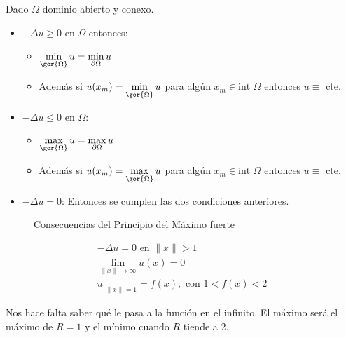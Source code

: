 		\begin{theorem}  \label{prop:MaximoFuerte}

			Dado $\Omega$ dominio abierto y conexo.

			\begin{itemize}
				\item $-\Delta u \geq 0$ en $\Omega$ entonces:
				\begin{itemize}
					\item $\min\limits_{\gor{\Omega}} u = \min\limits_{\partial \Omega} u$
					\item Además si $u(x_m) = \min\limits_{\gor{\Omega}} u$ para algún $x_m \in \text{int } \Omega$ entonces $u \equiv$ cte.
				\end{itemize}

				\item $-\Delta u \leq 0$ en $\Omega$:
				\begin{itemize}
					\item $\max\limits_{\gor{\Omega}} u = \max\limits_{\partial \Omega} u$
					\item Además si $u(x_m) = \max\limits_{\gor{\Omega}} u$ para algún $x_m \in \text{int } \Omega$ entonces $u \equiv$ cte.
				\end{itemize}

				\item $-\Delta u = 0$: Entonces se cumplen las dos condiciones anteriores.

			\end{itemize}

		\end{theorem}

		\begin{figure}[hbtp]
			\begin{minipage}[t]{0.33\linewidth}
			\end{minipage}
			\begin{minipage}[t]{0.33\linewidth}
			\end{minipage}
			\begin{minipage}[t]{0.33\linewidth}
			\end{minipage}
			\caption{Consecuencias del Principio del Máximo fuerte}
		\end{figure}

		\begin{example}

			\[\begin{array}{l}
				-\Delta u = 0 \text{ en } \|x\| > 1 \\
				\lim\limits_{\|x\| \to \infty} u(x) = 0 \\
				u|_{\|x\| = 1} = f(x), \text{ con } 1 < f(x) < 2
			\end{array}\]

			Nos hace falta saber qué le pasa a la función en el infinito. El máximo será el máximo de $R=1$ y el mínimo cuando $R$ tiende a 2.

		\end{example}



